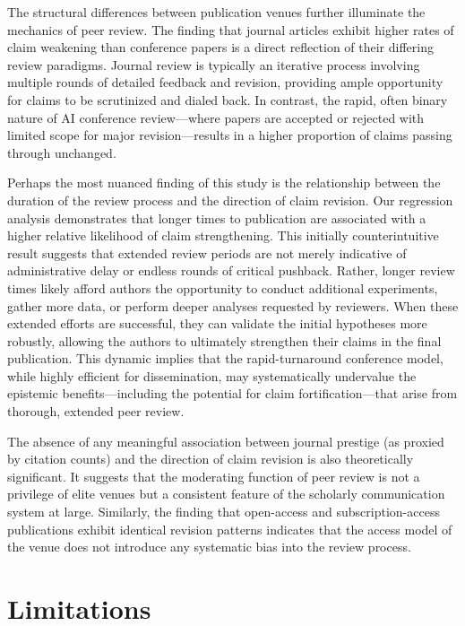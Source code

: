 \documentclass[11pt]{article}
\begin{document}
The structural differences between publication venues further illuminate the mechanics of peer review. The finding that journal articles exhibit higher rates of claim weakening than conference papers is a direct reflection of their differing review paradigms. Journal review is typically an iterative process involving multiple rounds of detailed feedback and revision, providing ample opportunity for claims to be scrutinized and dialed back. In contrast, the rapid, often binary nature of AI conference review---where papers are accepted or rejected with limited scope for major revision---results in a higher proportion of claims passing through unchanged.

Perhaps the most nuanced finding of this study is the relationship between the duration of the review process and the direction of claim revision. Our regression analysis demonstrates that longer times to publication are associated with a higher relative likelihood of claim strengthening. This initially counterintuitive result suggests that extended review periods are not merely indicative of administrative delay or endless rounds of critical pushback. Rather, longer review times likely afford authors the opportunity to conduct additional experiments, gather more data, or perform deeper analyses requested by reviewers. When these extended efforts are successful, they can validate the initial hypotheses more robustly, allowing the authors to ultimately strengthen their claims in the final publication. This dynamic implies that the rapid-turnaround conference model, while highly efficient for dissemination, may systematically undervalue the epistemic benefits---including the potential for claim fortification---that arise from thorough, extended peer review.

The absence of any meaningful association between journal prestige (as proxied by citation counts) and the direction of claim revision is also theoretically significant. It suggests that the moderating function of peer review is not a privilege of elite venues but a consistent feature of the scholarly communication system at large. Similarly, the finding that open-access and subscription-access publications exhibit identical revision patterns indicates that the access model of the venue does not introduce any systematic bias into the review process.

\section{Limitations}
\end{document}
